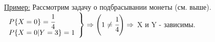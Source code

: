 \underline{Пример:} Рассмотрим задачу о подбрасывании монеты (см. выше). \\
$ \left. 
\begin{array}{lll}
	P\{X = 0\} = \cfrac{1}{4} \\
	P\{X = 0|Y = 3\} = 1 \\
\end{array} \right\} \Rightarrow \left(1 \neq \cfrac{1}{4} \right) \Rightarrow$ X и Y - зависимы.



























